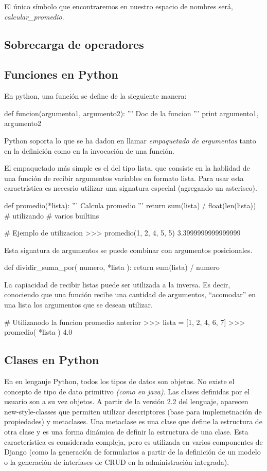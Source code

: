 \documentclass[a4paper]{report}
\begin{document}
El único símbolo que encontraremos en nuestro espacio de nombres será, \emph{calcular\_promedio}.
\subsection{Sobrecarga de operadores}

\subsection{Funciones en Python}
En python, una función se define de la sieguiente manera:
\begin{python}
def funcion(argumento1, argumento2):
  ''' Doc de la funcion '''
  print argumento1, argumento2
\end{python}
Python soporta lo que se ha dadon en llamar \emph{empaquetado de argumentos } tanto en la 
definición como en la invocación de una función.

El empaquetado más simple es el del tipo lista, que consiste en la hablidad de una función de
recibir argumentos variables en formato lista. Para usar esta caractrística es necesrio utilizar
una signatura especial (agregando un asterisco).

\begin{python}
def promedio(*lista):
  ''' Calcula promedio '''
  return sum(lista) / float(len(lista)) # utilizando 
					# varios builtins

# Ejemplo de utilizacion
>>> promedio(1, 2, 4, 5, 5)
3.3999999999999999

\end{python}
Esta signatura de argumentos se puede combinar con argumentos posicionales.
\begin{python}
def dividir_suma_por( numero, *lista ):
  return sum(lista) / numero
\end{python}
La capiacidad de recibir listas puede ser utilizada a la inversa. Es decir, conociendo que una función
recibe una cantidad de argumentos, ``acomodar'' en una lista los argumentos que se desean utilizar.
\begin{python}
# Utilizanodo la funcion promedio anterior
>>> lista = [1, 2, 4, 6, 7]
>>> promedio( *lista )
4.0
\end{python}


\subsection{Clases en Python}
En en lengauje Python, todos los tipos de datos son objetos. No existe el concepto
de tipo de dato primitivo \emph{(como en java)}. Las clases definidas por el usuario
son a su vez objetos.
A partir de la versión 2.2 del lenguaje, aparecen new-style-classes que permiten 
utilizar descriptores (base para implemetnación de propiedades) y metaclases.
Una metaclase es una clase que define la estructura de otra clase y es una forma dinámica de 
definir la estructura de una clase. Esta característica es considerada compleja, pero es 
utilizada en varios componentes de Django (como la generación de formularios a partir de la definición
de un modelo o la generación de interfases de CRUD en la administración integrada).
\end{document}
